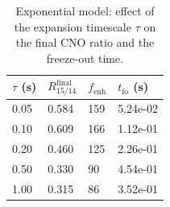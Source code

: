 \begin{table}[h!]
\centering
\caption{Exponential model: effect of the expansion timescale $\tau$ on the final CNO ratio and the freeze-out time.}
\begin{tabular}{llll}
\hline
$\tau$ (s) & $R^{\mathrm{final}}_{15/14}$ & $f_{\mathrm{enh}}$ & $t_{\mathrm{fo}}$ (s) \\
\hline
0.05 & 0.584 & 159 & 5.24e-02 \\
0.10 & 0.609 & 166 & 1.12e-01 \\
0.20 & 0.460 & 125 & 2.26e-01 \\
0.50 & 0.330 & 90 & 4.54e-01 \\
1.00 & 0.315 & 86 & 3.52e-01 \\
\hline
\end{tabular}
\label{tab:nucnetpy_tau}
\end{table}
